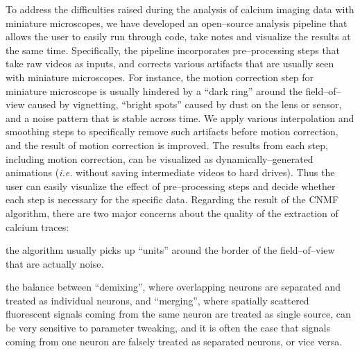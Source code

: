\documentclass[master.tex]{subfiles}
\begin{document}
To address the difficulties raised during the analysis of calcium imaging data
with miniature microscopes, we have developed an open--source analysis pipeline
that allows the user to easily run through code, take notes and visualize the
results at the same time. Specifically, the pipeline incorporates
pre--processing steps that take raw videos as inputs, and corrects various
artifacts that are usually seen with miniature microscopes. For instance, the
motion correction step for miniature microscope is usually hindered by a ``dark
ring'' around the field--of--view caused by vignetting, ``bright spots'' caused
by dust on the lens or sensor, and a noise pattern that is stable across time.
We apply various interpolation and smoothing steps to specifically remove such
artifacts before motion correction, and the result of motion correction is
improved. The results from each step, including motion correction, can be
visualized as dynamically--generated animations (\textit{i.e.} without saving
intermediate videos to hard drives). Thus the user can easily visualize the
effect of pre--processing steps and decide whether each step is necessary for
the specific data. Regarding the result of the CNMF algorithm, there are two
major concerns about the quality of the extraction of calcium traces:
\begin{inparaenum}[a)]
\item the algorithm usually picks up ``units'' around the border of the
  field--of--view that are actually noise.
\item the balance between ``demixing'', where overlapping neurons are separated
  and treated as individual neurons, and ``merging'', where spatially scattered
  fluorescent signals coming from the same neuron are treated as single source,
  can be very sensitive to parameter tweaking, and it is often the case that
  signals coming from one neuron are falsely treated as separated neurons, or
  vice versa.
\end{inparaenum}
\end{document}

